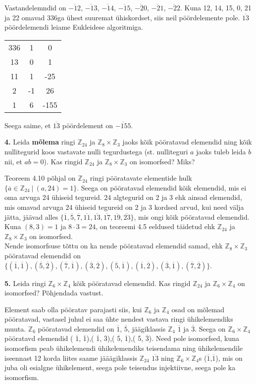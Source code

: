 \documentclass[a4paper, 10pt]{article}
\newcommand{\Z}{\mathbb{Z}}
\newcommand{\w}{\overline}
\begin{document}
\bigskip
Vastandelemndid on $\overline{-12}$, $\overline{-13}$, $\overline{-14}$, $\overline{-15}$, $\overline{-20}$, $\overline{-21}$, $\overline{-22}$. Kuna  12, 14, 15, 0, 21 ja 22 omavad 336ga ühest suuremat ühiskordset, siis neil pöördelemente pole. $\overline{13}$ pöördelemendi leiame Eukleidese algoritmiga.
\begin{center}
\begin{tabular}{ c c c}
336&1&0\\
13&0&1\\
11&1&-25\\
2&-1&26\\
1&6&-155
\end{tabular}
\end{center}
Seega saime, et $\overline{13}$ pöördelement on $\overline{-155}$.
\bigskip

\noindent \textbf{4.} Leida {\bf mõlema} ringi $\Z_{24}$ ja $\Z_{8}\times\Z_{3}$ jaoks k\~oik p\"o\"oratavad elemendid ning k\~oik nulli\-tegurid koos vastavate nulli tegurdustega (st. nulliteguri $a$ jaoks tuleb leida $b$ nii, et $ab=0$). Kas ringid $\Z_{24}$ ja $\Z_8\times\Z_{3}$ on isomorfsed? Miks?

\bigskip
Teoreem 4.10 põhjal on $\Z_{24}$ ringi pööratavate elementide hulk $\{\overline{a}\in\Z_{24}\ |\ (a,24)=1\}$. Seega on pööratavad elemendid kõik elemendid, mis ei oma arvuga 24 ühiseid tegureid. 24 algtegurid on 2 ja 3 ehk ainsad elemendid, mis omavad arvuga 24 ühiseid tegureid on 2 ja 3 kordsed arvud, kui need välja jätta, jäävad alles $\{\w1,\w5,\w7,\w{11},\w{13},\w{17},\w{19},\w{23}\}$, mis ongi kõik pööratavad elemendid.\\
Kuna $(8,3)=1$ ja $8\cdot3=24$, on teoreemi 4.5 eeldused täidetud ehk $\Z_{24}$ ja $\Z_8\times\Z_3$ on isomorfsed.\\
Nende isomorfsuse tõttu on ka nende pööratavad elemendid samad, ehk $\Z_8\times\Z_3$ pööratavad elemendid on $\{(\w1,\w1),(\w5,\w2),(\w7,\w1),(\w{3},\w2),(\w{5},\w1),(\w{1},\w2),(\w{3},\w1),(\w{7},\w2)\}$.
\bigskip

\noindent \textbf{5.} Leida ringi $\Z_{6}\times\Z_{4}$ k\~oik p\"o\"oratavad elemendid. Kas ringid $\Z_{24}$ ja $\Z_{6}\times\Z_{4}$ on isomorfsed? Põhjendada vastust.

\bigskip
Element saab olla pööratav parajasti siis, kui $\Z_6$ ja $\Z_4$ osad on mõlemad pööratavad, vastasel juhul ei saa ühte nendest vastava ringi ühikelemendiks muuta. $\Z_6$ pööratavad elemendid on $\overline{1}$, $\overline{5}$, jäägiklassis $\Z_4$  $\overline{1}$ ja $\overline{3}$. Seega on $\Z_6\times\Z_4$ pööratavd elemendid ( $\overline{1}$, $\overline{1}$),( $\overline{1}$, $\overline{3}$),( $\overline{5}$, $\overline{1}$),( $\overline{5}$, $\overline{3}$). Need pole isomorfsed, kuna isomorfism peab ühikelemendi ühikelemendiks teisendama ning ühikelemendile iseennast 12 korda liites saame jääägiklassis $\Z_{24}$ $\overline{13}$ ning $\Z_6\times\Z_4$s ($\overline{1}$,$\overline{1}$), mis on juba oli esialgne ühikelement, seega pole teisendus injektiivne, seega pole ka isomorfism.
\bigskip
\end{document}
